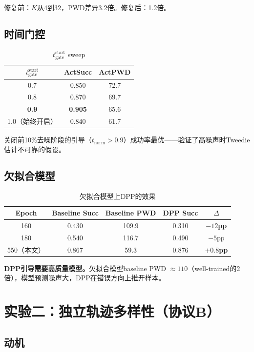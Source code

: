 \documentclass[11pt]{article}
\begin{document}
修复前：$K$从4到32，PWD差异3.2倍。修复后：1.2倍。

\subsection{时间门控}

\begin{table}[h]
\centering
\caption{$t_{\text{gate}}^{\text{start}}$ sweep}
\begin{tabular}{ccc}
\toprule
$t_{\text{gate}}^{\text{start}}$ & ActSucc & ActPWD \\
\midrule
0.7 & 0.850 & 72.7 \\
0.8 & 0.870 & 69.7 \\
\textbf{0.9} & \textbf{0.905} & 65.6 \\
1.0（始终开启） & 0.840 & 61.7 \\
\bottomrule
\end{tabular}
\end{table}

关闭前10\%去噪阶段的引导（$t_{\text{norm}} > 0.9$）成功率最优——验证了高噪声时Tweedie估计不可靠的假设。

\subsection{欠拟合模型}

\begin{table}[h]
\centering
\caption{欠拟合模型上DPP的效果}
\begin{tabular}{ccccc}
\toprule
Epoch & Baseline Succ & Baseline PWD & DPP Succ & $\Delta$ \\
\midrule
160 & 0.430 & 109.9 & 0.310 & \textbf{$-12$pp} \\
180 & 0.540 & 116.7 & 0.490 & $-5$pp \\
550（本文） & 0.867 & 59.3 & 0.876 & \textbf{$+0.8$pp} \\
\bottomrule
\end{tabular}
\end{table}

\textbf{DPP引导需要高质量模型。}欠拟合模型baseline PWD $\approx 110$（well-trained的2倍），模型预测噪声大，DPP在错误方向上推开样本。

\section{实验二：独立轨迹多样性（协议B）}

\subsection{动机}
\end{document}

